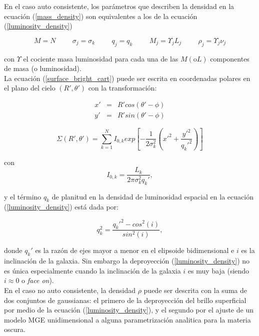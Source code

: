 En el caso auto consistente, los parámetros que describen la densidad en la ecuación (\ref{mass_density}) son equivalentes a los de la ecuación (\ref{luminosity_density})

$$ M=N \hspace{1cm} \sigma_j=\sigma_k  \hspace{1cm} q_j = q_k \hspace{1cm} M_j = \Upsilon_j L_j \hspace{1cm} \rho_j = \Upsilon_j \nu_j  $$

con $\Upsilon$ el cociente masa luminosidad para cada una de las $M (\textrm{o} L)$ componentes de masa (o luminosidad).\\


La ecuación (\ref{surface_bright_cart}) puede ser escrita en coordenadas polares en el plano del cielo $(R', \theta ')$ con la transformación:

\begin{eqnarray}
x' &=& R' cos(\theta ' - \phi) \\
y' &=& R' sin(\theta ' - \phi)
\end{eqnarray}

\begin{equation}
\label{surface_bright_polar}
\Sigma(R', \theta ') = \sum_{k=1}^{N} I_{0,k} exp \left[ -\frac{1}{2\sigma_k^2} \left( x'^2 + \frac{y'^2}{q_k'^2} \right) \right ]
\end{equation}

con $$ I_{0,k} = \frac{L_k}{ 2\pi \sigma_k^2 q_k' }, $$ 

y el término $q_k$ de planitud en la densidad de luminosidad espacial en la ecuación (\ref{luminosity_density}) está dada por:

\begin{equation}
\label{flattening}
q_k^2 = \frac{ q_k'^2 - cos^2 (i) }{ sin^2 (i) },
\end{equation}

donde $q_k'$ es la razón de ejes mayor a menor en el elipsoide bidimensional e $i$ es la inclinación de la galaxia. Sin embargo la deproyección (\ref{luminosity_density}) no es única especialmente cuando la inclinación de la galaxia $i$ es muy baja (siendo $i\approx 0$ o \emph{face on}).\\


En el caso no auto consistente, la densidad $\rho $ puede ser descrita con la suma de dos conjuntos de gaussianas: el primero de la deproyección del brillo superficial por medio de la ecuación (\ref{luminosity_density}), y el segundo por el ajuste de un modelo MGE unidimensional a alguna parametrización analitica para la materia oscura.\\


